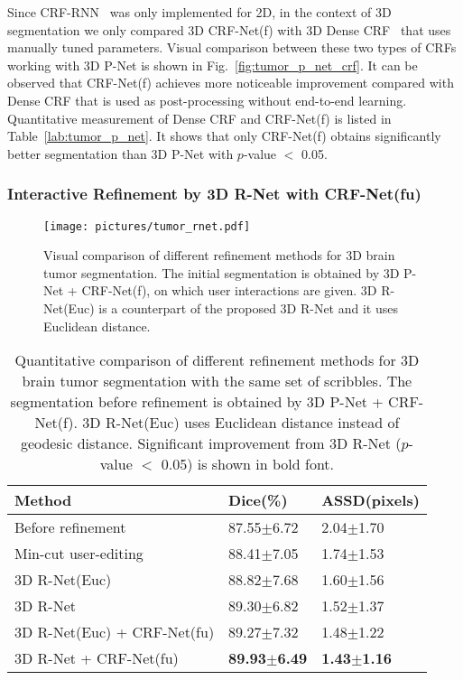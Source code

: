 \documentclass[10pt,journal,compsoc]{IEEEtran}
\begin{document}
Since CRF-RNN~\cite{Zheng2015a} was only implemented for 2D, in the context of 3D segmentation we only compared 3D CRF-Net(f) with 3D Dense CRF~\cite{Kamnitsas2017} that uses manually tuned parameters. Visual comparison between these two types of CRFs working with 3D P-Net is shown in Fig.~\ref{fig:tumor_p_net_crf}. It can be observed that CRF-Net(f) achieves more noticeable improvement compared with Dense CRF that is used as post-processing without end-to-end learning. Quantitative measurement of Dense CRF and CRF-Net(f) is listed in Table~\ref{lab:tumor_p_net}. It shows that only CRF-Net(f) obtains significantly better segmentation than 3D P-Net with $p$-value $<$ 0.05. %
\subsubsection{Interactive Refinement by 3D R-Net with CRF-Net(fu) }


\begin{figure*}[t]
	\centering
	\texttt{[image: pictures/tumor\_rnet.pdf]}
	\caption[Visual comparison of different refinement methods for 3D brain tumor segmentation.]{ 
			Visual comparison of different refinement methods for 3D brain tumor segmentation. The initial segmentation is obtained by 3D P-Net + CRF-Net(f), on which user interactions are given. 3D R-Net(Euc) is a counterpart of the proposed 3D R-Net and it uses Euclidean distance. } 
	\label{fig:tumor_r_net_crf}
\end{figure*}


\begin{table}
	\centering
	\small
	\caption{Quantitative comparison of different refinement methods for 3D brain tumor segmentation with the same set of scribbles. The segmentation before refinement is obtained by 3D P-Net + CRF-Net(f). 3D R-Net(Euc) uses Euclidean distance instead of geodesic distance. Significant improvement from 3D R-Net ($p$-value $<$ 0.05) is shown in bold font.}
	\label{lab:tumor_r_net_crf}
	\begin{tabular}{lll}
		
		\hline
		Method & Dice(\%) & ASSD(pixels) \\ \hline
		Before refinement & 87.55$\pm$6.72 & 2.04$\pm$1.70 \\
		Min-cut user-editing & 88.41$\pm$7.05 & 1.74$\pm$1.53 \\
		3D R-Net(Euc) & 88.82$\pm$7.68 &  1.60$\pm$1.56 \\ 
		
		3D R-Net & 89.30$\pm$6.82 & 1.52$\pm$1.37 \\
		3D R-Net(Euc) + CRF-Net(fu) & 89.27$\pm$7.32 & 1.48$\pm$1.22 \\
		3D R-Net + CRF-Net(fu) & \textbf{89.93$\pm$6.49} & \textbf{1.43$\pm$1.16} \\  
		\hline
	\end{tabular}
	
\end{table}
\end{document}
